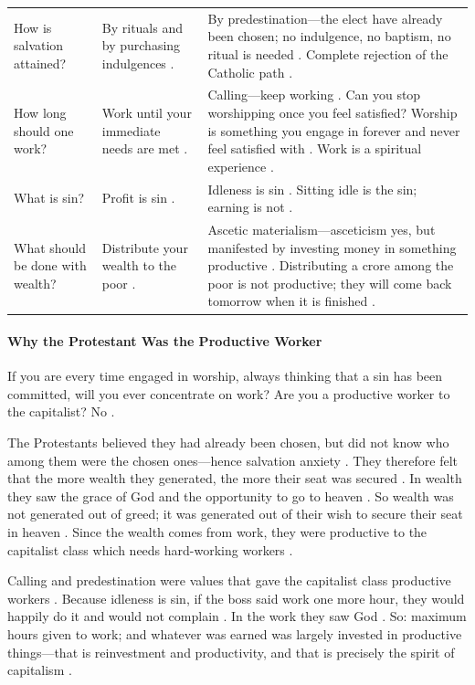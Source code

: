 \vspace{6pt}
\noindent
\begin{tabularx}{\textwidth}{>{\hsize}Y >{\hsize}Y >{\hsize}Y}
\toprule
{}
 &  &  \\
\midrule
How is salvation attained? & By rituals and by purchasing indulgences . & By predestination---the elect have already been chosen; no indulgence, no baptism, no ritual is needed . Complete rejection of the Catholic path . \\
\midrule
How long should one work? & Work until your immediate needs are met . & Calling---keep working . Can you stop worshipping once you feel satisfied? Worship is something you engage in forever and never feel satisfied with . Work is a spiritual experience . \\
\midrule
What is sin? & Profit is sin . & Idleness is sin . Sitting idle is the sin; earning is not . \\
\midrule
What should be done with wealth? & Distribute your wealth to the poor . & Ascetic materialism---asceticism yes, but manifested by investing money in something productive . Distributing a crore among the poor is not productive; they will come back tomorrow when it is finished . \\
\bottomrule
\end{tabularx}
\vspace{6pt}

\paragraph{Why the Protestant Was the Productive Worker}
If you are every time engaged in worship, always thinking that a sin has been committed, will you ever concentrate on work? Are you a productive worker to the capitalist? No .

The Protestants believed they had already been chosen, but did not know who among them were the chosen ones---hence salvation anxiety .
They therefore felt that the more wealth they generated, the more their seat was secured . In wealth they saw the grace of God and the opportunity to go to heaven . So wealth was not generated out of greed; it was generated out of their wish to secure their seat in heaven .
Since the wealth comes from work, they were productive to the capitalist class which needs hard-working workers .

Calling and predestination were values that gave the capitalist class productive workers . Because idleness is sin, if the boss said work one more hour, they would happily do it and would not complain . In the work they saw God .
So: maximum hours given to work; and whatever was earned was largely invested in productive things---that is reinvestment and productivity, and that is precisely the spirit of capitalism .

